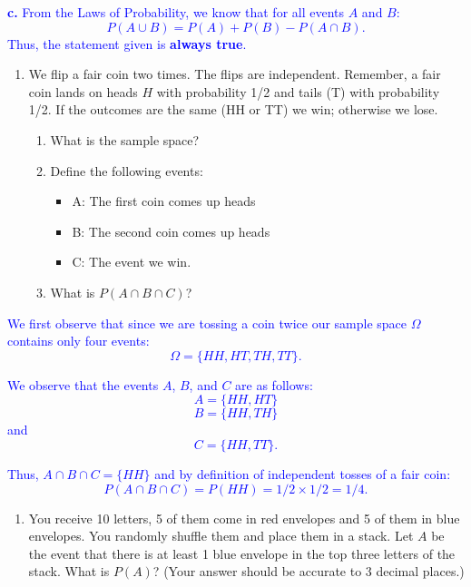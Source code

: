 \documentclass[
]{article}
\providecommand{\tightlist}{%
  \setlength{\itemsep}{0pt}\setlength{\parskip}{0pt}}
\begin{document}
\textcolor{blue}{\textbf{c.} From the Laws of Probability, we know that for all events $A$ and $B$:
$$P(A \cup B) = P(A) + P(B) - P(A \cap B).$$
Thus, the statement given is \textbf{always true}.}

\hfill\break

\begin{enumerate}
\def\labelenumi{\arabic{enumi}.}
\setcounter{enumi}{1}
\item
  We flip a fair coin two times. The flips are independent. Remember, a fair coin lands on heads \(H\) with probability 1/2 and tails (T) with probability 1/2. If the outcomes are the same (HH or TT) we win; otherwise we lose.

  \begin{enumerate}
  \def\labelenumii{\alph{enumii}.}
  \item
    What is the sample space?
  \item
    Define the following events:

    \begin{itemize}
    \tightlist
    \item
      A: The first coin comes up heads
    \item
      B: The second coin comes up heads
    \item
      C: The event we win.
    \end{itemize}
  \item
    What is \(P(A \cap B \cap C)\)?
  \end{enumerate}
\end{enumerate}

\textcolor{blue}{We first observe that since we are tossing a coin twice our sample space $\Omega$ contains only four events:
$$\Omega = \{ HH, HT, TH, TT \}.$$}

\textcolor{blue}{We observe that the events $A$, $B$, and $C$ are as follows:
$$A = \{ HH, HT \}$$
$$B = \{ HH, TH \}$$
and
$$C = \{HH,TT\}.$$}

\textcolor{blue}{Thus, $A \cap B \cap C = \{ HH \}$ and by definition of independent tosses of a fair coin:
$$P(A \cap B \cap C) = P(HH) = 1/2 \times 1/2 = 1/4.$$}

\hfill\break

\begin{enumerate}
\def\labelenumi{\arabic{enumi}.}
\setcounter{enumi}{2}
\tightlist
\item
  You receive 10 letters, 5 of them come in red envelopes and 5 of them in blue envelopes. You randomly shuffle them and place them in a stack. Let \(A\) be the event that there is at least 1 blue envelope in the top three letters of the stack. What is \(P(A)\)? (Your answer should be accurate to 3 decimal places.)
\end{enumerate}
\end{document}
